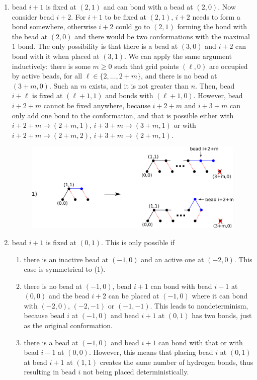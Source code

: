 \begin{enumerate}
	\item bead $i+1$ is fixed at $(2,1)$ and can bond with a bead at $(2,0)$. Now consider bead $i+2$. For $i+1$ to be fixed at $(2,1)$, $i+2$ needs to form a bond somewhere, otherwise $i+2$ could go to $(2,1)$ forming the bond with the bead at $(2,0)$ and there would be two conformations with the maximal $1$ bond. The only possibility is that there is a bead at $(3,0)$ and $i+2$ can bond with it when placed at $(3,1)$. We can apply the same argument inductively: there is some $m\geq 0$ such that grid points $(\ell,0)$ are occupied by active beads, for all $\ell\in \{2,\dots,2+m\}$, and there is no bead at $(3+m,0)$. Such an $m$ exists, and it is not greater than $n$. Then, bead $i+\ell$ is fixed at $(\ell+1,1)$ and bonds with $(\ell+1,0)$. However, bead $i+2+m$ cannot be fixed anywhere, because $i+2+m$ and $i+3+m$ can only add one bond to the conformation, and that is possible either with $i+2+m \rightarrow (2+m,1)$, $i+3+m \rightarrow (3+m,1)$ or with $i+2+m \rightarrow (2+m,2)$, $i+3+m \rightarrow (2+m,1)$. 
	\begin{figure}
		\centering
		\includegraphics[width=0.9\linewidth]{./Fig/hexagonOut2}
		\caption{}
		\label{fig:hexagonout2}
	\end{figure}
	
	\item bead $i+1$ is fixed at $(0,1)$. This is only possible if
	\begin{enumerate}
		\item there is an inactive bead at $(-1,0)$ and an active one at $(-2,0)$. This case is symmetrical to (1).
		\item there is no bead at $(-1,0)$, bead $i+1$ can bond with bead $i-1$ at $(0,0)$ and the bead $i+2$ can be placed at $(-1,0)$ where it can bond with $(-2,0)$, $(-2,-1)$ or $(-1,-1)$. This leads to nondeterminism, because bead $i$ at $(-1,0)$ and bead $i+1$ at $(0,1)$ has two bonds, just as the original conformation.
		\item there is a bead at $(-1,0)$ and bead $i+1$ can bond with that or with bead $i-1$ at $(0,0)$. However, this means that placing bead $i$ at $(0,1)$ at bead $i+1$ at $(1,1)$ creates the same number of hydrogen bonds, thus resulting in bead $i$ not being placed deterministically.
		
	\end{enumerate}
\end{enumerate}




